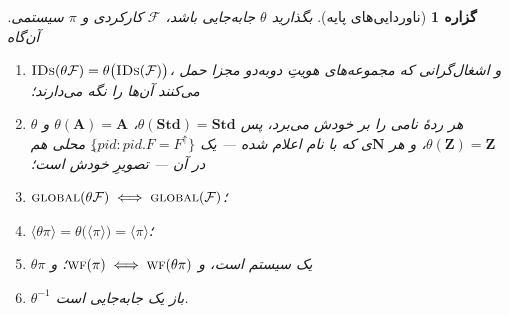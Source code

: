 \documentclass[10pt,oneside,openany]{book}
\newcommand{\PID}{\mathit{pid}}
\newcommand{\admits}{\mathbf{N}}
\newcommand{\Apid}{\mathbf{A}}
\newcommand{\Zpid}{\mathbf{Z}}
\newcommand{\Stdpid}{\mathbf{Std}}
\newcommand{\WF}{\op{wf}}
\newcommand{\F}{\mathcal{F}}
\newcommand{\op}[1]{\textnormal{\textsc{#1}}}
\newcommand{\IDs}{\op{IDs}}
\newcommand{\parent}{\mathord{\uparrow}}
\newcommand{\ncl}[1]{\langle #1 \rangle}
\theoremstyle{accentdef}
\theoremstyle{accentplain}
\newtheorem{proposition}[definition]{گزاره}
\begin{document}
\begin{proposition}[ناوردایی‌های پایه]\label{prop:relocbasic}
بگذارید $\theta$ جابه‌جایی باشد، $\F$ کارکردی و $\pi$ سیستمی. آن‌گاه
\begin{enumerate}[label=(\roman*),leftmargin=2.2em]
  \item $\IDs(\theta\F) = \theta\bigl(\IDs(\F)\bigr)$، و اشغال‌گرانی که مجموعه‌های
        هویتِ دوبه‌دو مجزا حمل می‌کنند آن‌ها را نگه می‌دارند؛
  \item $\theta$ هر ردهٔ نامی را بر خودش می‌برد، پس $\theta(\Stdpid) = \Stdpid$،
        $\theta(\Apid) = \Apid$ و $\theta(\Zpid) = \Zpid$، و هر $\admits$ی که با نام
        اعلام شده --- یک $\{\PID : \PID.F = F^{\parent}\}$ِ محلی هم در آن --- تصویرِ خودش است؛
  \item $\op{global}(\theta\F) \iff \op{global}(\F)$؛
  \item $\ncl{\theta\pi} = \theta\bigl(\ncl{\pi}\bigr) = \ncl{\pi}$؛
  \item $\theta\pi$ یک سیستم است، و $\WF(\pi) \iff \WF(\theta\pi)$؛ و
  \item $\theta^{-1}$ باز یک جابه‌جایی است.
\end{enumerate}
\end{proposition}
\end{document}
